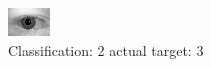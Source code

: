 \begin{figure}[h!]
\begin{center}
\includegraphics[width=0.60\columnwidth]{figures/ID662_class_2_target_3.png}
\end{center}
\caption{ Classification: 2 actual target: 3}
\label{fig:ID662_class_2_target_3}
\end{figure}
